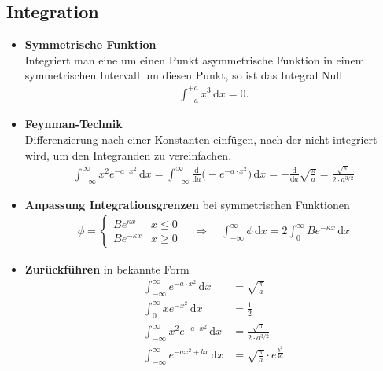 \documentclass{article}
\newcommand{\diff}{\mathrm{d}}
\begin{document}
\subsection{Integration}
	\begin{itemize}
		\item \textbf{Symmetrische Funktion}\\
		Integriert man eine um einen Punkt asymmetrische Funktion in einem symmetrischen Intervall um diesen Punkt, so ist das Integral Null
			\begin{align*}
				\int_{-a}^{+a} x^3\,\diff x = 0.
			\end{align*}


		\item \textbf{Feynman-Technik}\\
		Differenzierung nach einer Konstanten einfügen, nach der nicht integriert wird, um den Integranden zu vereinfachen.
			\begin{align*}
				\int_{-\infty}^\infty x^2e^{-a\cdot x^2}\,\diff x = \int_{-\infty}^\infty \frac{\diff}{\diff a} \big( -e^{-a\cdot x^2}\big)\,\diff x = -\frac{\diff}{\diff a} \sqrt{\frac{\pi}{a}} = \frac{\sqrt{\pi}}{2\cdot a^{3/2}}
			\end{align*}


		\item \textbf{Anpassung Integrationsgrenzen} bei symmetrischen Funktionen
			\begin{align*}
				\phi = 
				\begin{cases}
					Be^{\kappa x} & x\leq 0\\
					Be^{-\kappa x} & x\geq 0 
				\end{cases} \quad\Rightarrow\quad \int_{-\infty}^{\infty} \phi \, \diff x = 2\int_{0}^{\infty} Be^{-\kappa x} \, \diff x
			\end{align*}


		\item \textbf{Zurückführen} in bekannte Form
			\begin{align}
				\label{gauß integral}
				\int_{-\infty}^{\infty} e^{-a\cdot x^2}\,\diff x &= \sqrt{\frac{\pi}{a}} \\
				\int_0^\infty xe^{-x^2}\,\diff x &= \frac{1}{2} \\
				\int_{-\infty}^\infty x^2e^{-a\cdot x^2}\,\diff x &= \frac{\sqrt{\pi}}{2\cdot a^{3/2}} \\
				\int_{-\infty}^\infty e^{-ax^2 + bx}\,\diff x &= \sqrt{\frac{\pi}{a}} \cdot e^{\frac{b^2}{4a}}
			\end{align}



\end{itemize}
\end{document}
